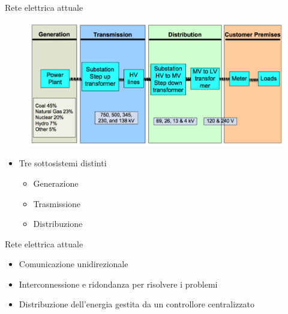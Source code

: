 \begin{frame}{Rete elettrica attuale}
	\begin{figure}[h] 
		\includegraphics[scale=0.25]{imgs/elect_grid.png}
	\end{figure}

\begin{itemize}[<+- | alert@+>]
	\item Tre sottosistemi distinti
		\begin{itemize}
		\item Generazione
		\item Trasmissione
		\item Distribuzione
		\end{itemize}
\end{itemize}
\end{frame}

\begin{frame}{Rete elettrica attuale}
	\begin{itemize}[<+- | alert@+>]
	\item Comunicazione unidirezionale
	\item Interconnessione e ridondanza per risolvere i problemi
	\item Distribuzione dell'energia gestita da un controllore centralizzato
	\end{itemize}

\end{frame}

